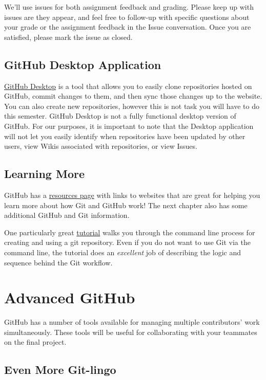 \documentclass[]{book}
\theoremstyle{definition}
\theoremstyle{definition}
\theoremstyle{definition}
\theoremstyle{remark}
\begin{document}
We'll use issues for both assignment feedback and grading. Please keep
up with issues are they appear, and feel free to follow-up with specific
questions about your grade or the assignment feedback in the Issue
conversation. Once you are satisfied, please mark the issue as closed.

\section{GitHub Desktop Application}\label{github-desktop-application}

\href{https://desktop.github.com}{GitHub Desktop} is a tool that allows
you to easily clone repositories hosted on GitHub, commit changes to
them, and then sync those changes up to the website. You can also create
new repositories, however this is not task you will have to do this
semester. GitHub Desktop is not a fully functional desktop version of
GitHub. For our purposes, it is important to note that the Desktop
application will not let you easily identify when repositories have been
updated by other users, view Wikis associated with repositories, or view
Issues.

\section{Learning More}\label{learning-more}

GitHub has a
\href{https://help.github.com/articles/good-resources-for-learning-git-and-github/}{resources
page} with links to websites that are great for helping you learn more
about how Git and GitHub work! The next chapter also has some additional
GitHub and Git information.

One particularly great \href{https://try.github.io/}{tutorial} walks you
through the command line process for creating and using a git
repository. Even if you do not want to use Git via the command line, the
tutorial does an \emph{excellent} job of describing the logic and
sequence behind the Git workflow.

\chapter{Advanced GitHub}\label{advanced-github}

GitHub has a number of tools available for managing multiple
contributors' work simultaneously. These tools will be useful for
collaborating with your teammates on the final project.

\section{Even More Git-lingo}\label{even-more-git-lingo}
\end{document}
